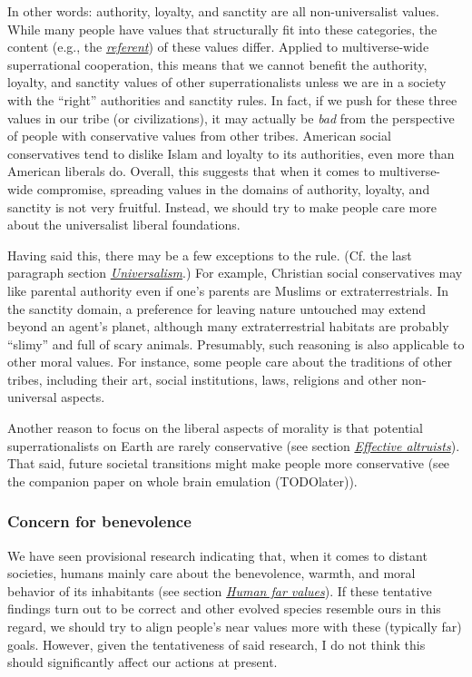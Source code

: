 In other words: authority, loyalty, and sanctity are all
non-universalist values. While many people have values that structurally
fit into these categories, the content (e.g., the
\href{https://en.wikipedia.org/wiki/Referent}{\emph{referent}}) of these
values differ. Applied to multiverse-wide superrational cooperation,
this means that we cannot benefit the authority, loyalty, and sanctity
values of other superrationalists unless we are in a society with the
``right'' authorities and sanctity rules. In fact, if we push for these
three values in our tribe (or civilizations), it may actually be
\emph{bad} from the perspective of people with conservative values from
other tribes. American social conservatives tend to dislike Islam and
loyalty to its authorities, even more than American liberals do.
Overall, this suggests that when it comes to multiverse-wide compromise,
spreading values in the domains of authority, loyalty, and sanctity is
not very fruitful. Instead, we should try to make people care more about
the universalist liberal foundations.

Having said this, there may be a few exceptions to the rule. (Cf. the
last paragraph section
\protect\hyperlink{universalism}{\emph{Universalism}}.) For example,
Christian social conservatives may like parental authority even if one's
parents are Muslims or extraterrestrials. In the sanctity domain, a
preference for leaving nature untouched may extend beyond an agent's
planet, although many extraterrestrial habitats are probably ``slimy''
and full of scary animals. Presumably, such reasoning is also applicable
to other moral values. For instance, some people care about the
traditions of other tribes, including their art, social institutions,
laws, religions and other non-universal aspects.

Another reason to focus on the liberal aspects of morality is that
potential superrationalists on Earth are rarely conservative (see
section \protect\hyperlink{effective-altruists}{\emph{Effective
altruists}}). That said, future societal transitions might make people
more conservative (see the companion paper on whole brain emulation
(TODOlater)).

\subsubsection{Concern for benevolence}\label{concern-for-benevolence}

We have seen provisional research indicating that, when it comes to
distant societies, humans mainly care about the benevolence, warmth, and
moral behavior of its inhabitants (see section
\protect\hyperlink{human-far-values}{\emph{Human far values}}). If
these tentative findings turn out to be correct and other evolved
species resemble ours in this regard, we should try to align people's
near values more with these (typically far) goals. However, given the
tentativeness of said research, I do not think this should significantly
affect our actions at present.

